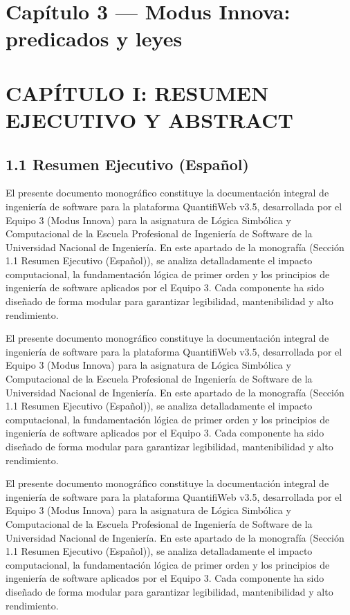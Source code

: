 \documentclass[11pt,a4paper]{article}
\begin{document}
\section{Cap\'itulo 3 --- Modus Innova: predicados y leyes}
\section{CAPÍTULO I: RESUMEN EJECUTIVO Y ABSTRACT}

\subsection{1.1 Resumen Ejecutivo (Español)}

El presente documento monográfico constituye la documentación integral
de ingeniería de software para la plataforma QuantifiWeb v3.5,
desarrollada por el Equipo 3 (Modus Innova) para la asignatura de Lógica
Simbólica y Computacional de la Escuela Profesional de Ingeniería de
Software de la Universidad Nacional de Ingeniería. En este apartado de
la monografía (Sección 1.1 Resumen Ejecutivo (Español)), se analiza
detalladamente el impacto computacional, la fundamentación lógica de
primer orden y los principios de ingeniería de software aplicados por el
Equipo 3. Cada componente ha sido diseñado de forma modular para
garantizar legibilidad, mantenibilidad y alto rendimiento.

El presente documento monográfico constituye la documentación integral
de ingeniería de software para la plataforma QuantifiWeb v3.5,
desarrollada por el Equipo 3 (Modus Innova) para la asignatura de Lógica
Simbólica y Computacional de la Escuela Profesional de Ingeniería de
Software de la Universidad Nacional de Ingeniería. En este apartado de
la monografía (Sección 1.1 Resumen Ejecutivo (Español)), se analiza
detalladamente el impacto computacional, la fundamentación lógica de
primer orden y los principios de ingeniería de software aplicados por el
Equipo 3. Cada componente ha sido diseñado de forma modular para
garantizar legibilidad, mantenibilidad y alto rendimiento.

El presente documento monográfico constituye la documentación integral
de ingeniería de software para la plataforma QuantifiWeb v3.5,
desarrollada por el Equipo 3 (Modus Innova) para la asignatura de Lógica
Simbólica y Computacional de la Escuela Profesional de Ingeniería de
Software de la Universidad Nacional de Ingeniería. En este apartado de
la monografía (Sección 1.1 Resumen Ejecutivo (Español)), se analiza
detalladamente el impacto computacional, la fundamentación lógica de
primer orden y los principios de ingeniería de software aplicados por el
Equipo 3. Cada componente ha sido diseñado de forma modular para
garantizar legibilidad, mantenibilidad y alto rendimiento.
\end{document}
